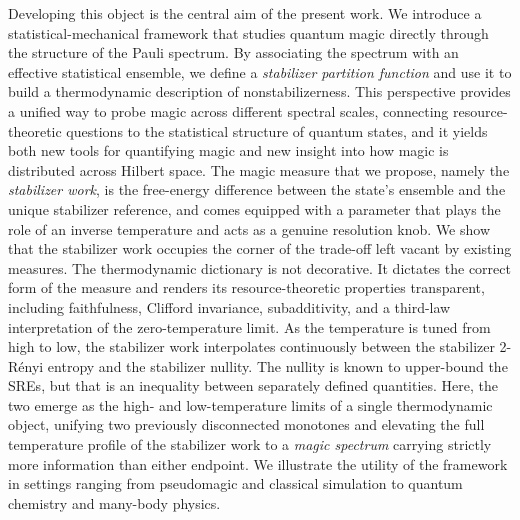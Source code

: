 \documentclass[aps,pra,superscriptaddress,twocolumn,longbibliography]{revtex4-2}
\begin{document}
Developing this object is the central aim of the present work. We introduce a statistical-mechanical framework that studies quantum magic directly through the structure of the Pauli spectrum. By associating the spectrum with an effective statistical ensemble, we define a \textit{stabilizer partition function} and use it to build a thermodynamic description of nonstabilizerness. 
This perspective provides a unified way to probe magic across different spectral scales, connecting resource-theoretic questions to the statistical structure of quantum states, and it yields both new tools for quantifying magic and new insight into how magic is distributed across Hilbert space.
The magic measure that we propose, namely the \textit{stabilizer work}, is the free-energy difference between the state's ensemble and the unique stabilizer reference, and comes equipped with a parameter that plays the role of an inverse temperature and acts as a genuine resolution knob.
We show that the stabilizer work occupies the corner of the trade-off left vacant by existing measures. 
The thermodynamic dictionary is not decorative. It dictates the correct form of the measure and renders its resource-theoretic properties transparent, including faithfulness, Clifford invariance, subadditivity, and a third-law interpretation of the zero-temperature limit.
As the temperature is tuned from high to low, the stabilizer work interpolates continuously between the stabilizer 2-R\'enyi entropy and the stabilizer nullity.
The nullity is known to upper-bound the SREs, but that is an inequality between separately defined quantities.
Here, the two emerge as the high- and low-temperature limits of a single thermodynamic object, unifying two previously disconnected monotones and elevating the full temperature profile of the stabilizer work to a \textit{magic spectrum} carrying strictly more information than either endpoint.
We illustrate the utility of the framework in settings ranging from pseudomagic and classical simulation to quantum chemistry and many-body physics.
\end{document}
